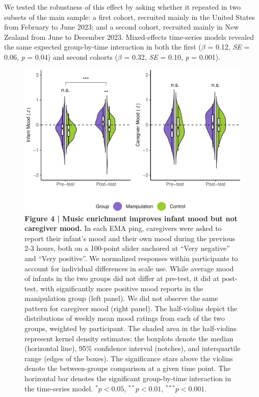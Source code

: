 \documentclass[
]{article}
\begin{document}
We tested the robustness of this effect by asking whether it repeated in
two subsets of the main sample: a first cohort, recruited mainly in the
United States from February to June 2023; and a second cohort, recruited
mainly in New Zealand from June to December 2023. Mixed-effects
time-series models revealed the same expected group-by-time interaction
in both the first (\(\beta\) = 0.12, \emph{SE} = 0.06, \emph{p} = 0.04)
and second cohorts (\(\beta\) = 0.32, \emph{SE} = 0.10, \emph{p} =
0.001).

\begin{figure}[p]
\includegraphics{MIPH_childdev_files/figure-latex/fig4-1} \caption{\textbf{Figure 4 | Music enrichment improves infant mood but not caregiver mood.} In each EMA ping, caregivers were asked to report their infant's mood and their own mood during the previous 2-3 hours, both on a 100-point slider anchored at ``Very negative'' and ``Very positive''. We normalized responses within participants to account for individual differences in scale use. While average mood of infants in the two groups did not differ at pre-test, it did at post-test, with significantly more positive mood reports in the manipulation group (left panel). We did not observe the same pattern for caregiver mood (right panel). The half-violins depict the distributions of weekly mean mood ratings from each of the two groups, weighted by participant. The shaded area in the half-violins represent kernel density estimates; the boxplots denote the median (horizontal line), 95\% confidence interval (notches), and interquartile range (edges of the boxes). The significance stars above the violins denote the between-groups comparison at a given time point. The horizontal bar denotes the significant group-by-time interaction in the time-series model. $^{\ast}p < 0.05$, $^{\ast\ast}p < 0.01$, $^{\ast\ast\ast}p < 0.001$.}\label{fig:fig4}
\end{figure}
\end{document}
